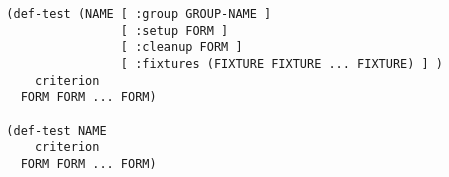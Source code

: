 \begin{verbatim}
  (def-test (NAME [ :group GROUP-NAME ]
                  [ :setup FORM ]
                  [ :cleanup FORM ]
                  [ :fixtures (FIXTURE FIXTURE ... FIXTURE) ] )
      criterion
    FORM FORM ... FORM)

  (def-test NAME
      criterion
    FORM FORM ... FORM)
\end{verbatim}
